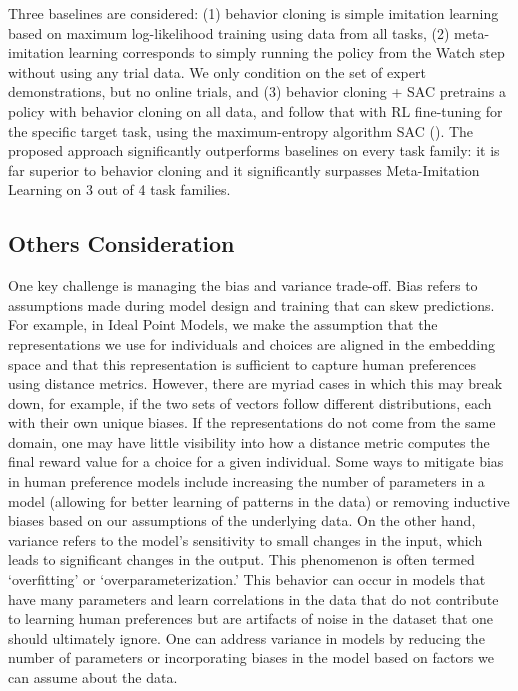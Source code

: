 \documentclass[
  letterpaper,
  numbers=noenddot,
  DIV=11]{scrreprt}
\theoremstyle{plain}
\theoremstyle{definition}
\theoremstyle{plain}
\theoremstyle{remark}
\begin{document}
Three baselines are considered: (1) behavior cloning is simple imitation
learning based on maximum log-likelihood training using data from all
tasks, (2) meta-imitation learning corresponds to simply running the
policy from the Watch step without using any trial data. We only
condition on the set of expert demonstrations, but no online trials, and
(3) behavior cloning + SAC pretrains a policy with behavior cloning on
all data, and follow that with RL fine-tuning for the specific target
task, using the maximum-entropy algorithm SAC
(). The proposed
approach significantly outperforms baselines on every task family: it is
far superior to behavior cloning and it significantly surpasses
Meta-Imitation Learning on 3 out of 4 task families.

\subsection{Others Consideration}\label{others-consideration}

One key challenge is managing the bias and variance trade-off. Bias
refers to assumptions made during model design and training that can
skew predictions. For example, in Ideal Point Models, we make the
assumption that the representations we use for individuals and choices
are aligned in the embedding space and that this representation is
sufficient to capture human preferences using distance metrics. However,
there are myriad cases in which this may break down, for example, if the
two sets of vectors follow different distributions, each with their own
unique biases. If the representations do not come from the same domain,
one may have little visibility into how a distance metric computes the
final reward value for a choice for a given individual. Some ways to
mitigate bias in human preference models include increasing the number
of parameters in a model (allowing for better learning of patterns in
the data) or removing inductive biases based on our assumptions of the
underlying data. On the other hand, variance refers to the model's
sensitivity to small changes in the input, which leads to significant
changes in the output. This phenomenon is often termed `overfitting' or
`overparameterization.' This behavior can occur in models that have many
parameters and learn correlations in the data that do not contribute to
learning human preferences but are artifacts of noise in the dataset
that one should ultimately ignore. One can address variance in models by
reducing the number of parameters or incorporating biases in the model
based on factors we can assume about the data.
\end{document}
